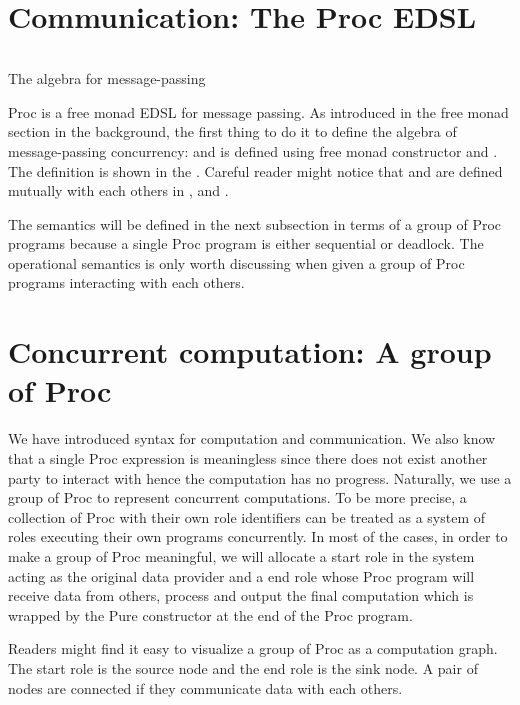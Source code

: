 \section{Communication: The Proc EDSL}
\begin{listing}[ht]
    \inputminted{Haskell}{spar/procf.hs}
    \caption{The algebra for message-passing}
    \label{spar:code:procf}
\end{listing}

Proc is a free monad EDSL for message passing. As introduced in the free monad section in the background, the first thing to do it to define the algebra of message-passing concurrency:  and  is defined using free monad constructor and . The definition is shown in the . Careful reader might notice that  and  are defined mutually with each others in ,  and .

The semantics will be defined in the next subsection in terms of a group of Proc programs because a single Proc program is either sequential or deadlock. The operational semantics is only worth discussing when given a group of Proc programs interacting with each others.

\section{Concurrent computation: A group of Proc}
We have introduced syntax for computation and communication. We also know that a single Proc expression is meaningless since there does not exist another party to interact with hence the computation has no progress. Naturally, we use a group of Proc to represent concurrent computations. To be more precise, a collection of Proc with their own role identifiers can be treated as a system of roles executing their own programs concurrently. In most of the cases, in order to make a group of Proc meaningful, we will allocate a start role in the system acting as the original data provider and a end role whose Proc program will receive data from others, process and output the final computation which is wrapped by the Pure constructor at the end of the Proc program. 

Readers might find it easy to visualize a group of Proc as a computation graph. The start role is the source node and the end role is the sink node. A pair of nodes are connected if they communicate data with each others.

